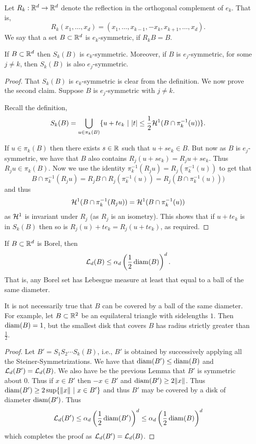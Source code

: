 \documentclass[twoside, a4paper, 10pt]{amsart}
\begin{document}
Let $R_k:\mathbb{R}^d \to \mathbb{R}^d$ denote the reflection in the orthogonal complement of $e_k$. That is, $$R_k(x_1, \ldots, x_d) = (x_1, \ldots, x_{k-1}, -x_k, x_{k+1}, \ldots, x_d).$$ We say that a set $B \subset \mathbb{R}^d$ is $e_k$-symmetric, if $R_kB = B$. 

\begin{lemma} If $B \subset \mathbb{R}^d$ then $S_k(B)$ is $e_k$-symmetric. Moreover, if $B$ is $e_j$-symmetric, for some $j \neq k$, then $S_k(B)$ is also $e_j$-symmetric.

\end{lemma}

\begin{proof} That $S_k(B)$ is $e_k$-symmetric is clear from the definition. We now prove the second claim. Suppose $B$ is $e_j$-symmetric with $j \neq k$. 

Recall the definition,  
$$S_k(B) = \bigcup_{u \in \pi_k(B)}\{ u + te_k ~|~ |t| \leq \frac{1}{2} \mathcal{H}^{1}(B \cap \pi_k^{-1}(u)) \}.$$

If $u \in \pi_k(B)$ then there exists $s \in \mathbb{R}$ such that $u + se_k \in B$. But now as $B$ is $e_j$-symmetric, we have that $B$ also contains $R_j(u+se_k) = R_ju + se_k$. Thus $R_ju \in \pi_k(B)$. 
Now we use the identity $\pi_k^{-1}(R_ju) = R_j(\pi_k^{-1}(u))$ to get that 
$$B \cap \pi_{k}^{-1}(R_ju) = R_jB \cap R_j (\pi_{k}^{-1}(u)) = R_j (B \cap \pi_k^{-1}(u))) $$ and thus $$\mathcal{H}^1(B \cap \pi_{k}^{-1}(R_ju) ) = \mathcal{H}^1(B \cap \pi_{k}^{-1}(u) )$$ as $\mathcal{H}^1$ is invariant under $R_j$ (as $R_j$ is an isometry). This shows that if $u + te_k$ is in $S_{k}(B)$ then so is $R_j(u) + te_k = R_j(u+te_k)$, as required. \end{proof}

\begin{thm} If $B \subset \mathbb{R}^d$ is Borel, then $$\mathcal{L}_d(B) \leq \alpha_d \left(\frac{1}{2}\operatorname{diam}(B)\right)^d.$$ That is, any Borel set has Lebesgue measure at least that equal to a ball of the same diameter.
\end{thm}

\begin{remark} It is not necessarily true that $B$ can be covered by a ball of the same diameter. For example, let $B \subset \mathbb{R}^2$ be an equilateral triangle with sidelengths $1$. Then $\operatorname{diam}(B)=1$, but the smallest disk that covers $B$ has radius strictly greater than $\frac{1}{2}$.
\end{remark}

\begin{proof} Let $B' = S_1S_2 \cdots S_k(B)$, i.e., $B'$ is obtained by successively applying all the Steiner-Symmetrizations. We have that $\operatorname{diam}(B') \leq \operatorname{diam}(B)$ and $\mathcal{L}_d(B') = \mathcal{L}_d(B)$. We also have be the previous Lemma that $B'$ is symmetric about $0$. Thus if $x \in B'$ then $-x \in B'$ and $\operatorname{diam}(B') \geq 2\|x\|$. Thus $\operatorname{diam}(B') \geq 2 \sup\{ \|x\| ~|~ x \in B'\}$ and thus $B'$ may be covered by a disk of diameter $\operatorname{diam}(B')$. Thus $$\mathcal{L}_d(B') \leq \alpha_d \left(\frac{1}{2}\operatorname{diam}(B')\right)^d \leq \alpha_d \left(\frac{1}{2}\operatorname{diam}(B)\right)^d $$ which completes the proof as $\mathcal{L}_d(B') = \mathcal{L}_d(B)$. \end{proof}
\end{document}
